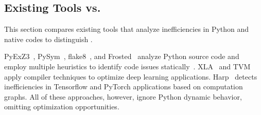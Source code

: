 \begin{comment}

\myparabb{Python Call Path Profiling} Call path profiling~\cite{hall1992call} is a widely-used profiling technique, it builds the profiling metrics based on different call paths. For Python applications, a call path of an instruction contains both procedure frames (on the call stack) and Python function call chains (in the Python runtime) at the point when the instruction executes. A call path begins at Python runtime/thread's entry and ends at the instruction pointer. When collect a profiling event, the profiler runtime aggregates it based on the call path of instruction (that triggers the event). Flat profiling, which is function level measurement, will introduce ambiguities when a same leaf function is invoked from multiple call paths. Compared with flat profiling, call path profiling is more comprehensive for complex applications.
\end{comment}

\subsection{Existing Tools vs. \tool}\label{sec:related}


This section compares existing tools that analyze inefficiencies in Python and native codes to distinguish \tool.

PyExZ3~\cite{irlbeck2015deconstructing}, PySym~\cite{pysym}, flake8~\cite{flake8}, and Frosted~\cite{frosted} analyze Python source code and employ multiple heuristics to identify code issues statically~\cite{gulabovska2019survey}. XLA~\cite{xla2017xla} and TVM~\cite{chen2018tvm} apply compiler techniques to optimize deep learning applications. Harp~\cite{zhou2020harp} detects inefficiencies in Tensorflow and PyTorch applications based on computation graphs. All of these approaches, however, ignore Python dynamic behavior, omitting optimization opportunities. 


